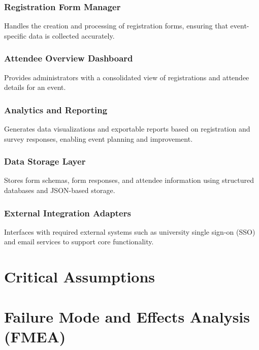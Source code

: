 \documentclass{article}
\begin{document}
\subsubsection{Registration Form Manager}
Handles the creation and processing of registration forms, ensuring that event-specific data is collected accurately.

\subsubsection{Attendee Overview Dashboard}
Provides administrators with a consolidated view of registrations and attendee details for an event.

\subsubsection{Analytics and Reporting}
Generates data visualizations and exportable reports based on registration and survey responses, enabling event planning and improvement.

\subsubsection{Data Storage Layer}
Stores form schemas, form responses, and attendee information using structured databases and JSON-based storage.

\subsubsection{External Integration Adapters}
Interfaces with required external systems such as university single sign-on (SSO) and email services to support core functionality.




\section{Critical Assumptions}


\section{Failure Mode and Effects Analysis (FMEA)}
\end{document}
